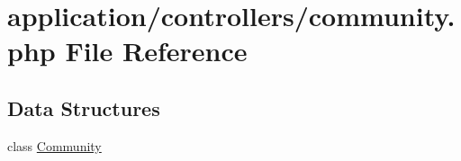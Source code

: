 \hypertarget{community_8php}{\section{application/controllers/community.php File Reference}
\label{community_8php}
}
\subsection*{Data Structures}
\begin{DoxyCompactItemize}
\item 
class \hyperlink{class_community}{Community}
\end{DoxyCompactItemize}
